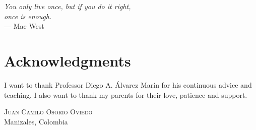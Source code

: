
\begin{flushright}{\slshape
    You only live once, but if you do it right, \\
    once is enough.} \\ \medskip
    --- {Mae West}
\end{flushright}



\bigskip

\begingroup
\let\clearpage\relax
\let\cleardoublepage\relax
\let\cleardoublepage\relax
\chapter*{Acknowledgments}

I want to thank Professor Diego A. Álvarez Marín for his continuous advice and teaching. I also want to thank my parents for their love, patience and support. 

\bigskip

\begin{flushright}
	\textsc{Juan Camilo Osorio Oviedo}\\ \vspace{-1mm}
	Manizales, Colombia\\ \vspace{-1mm}
	\myTime
\end{flushright}

\endgroup
